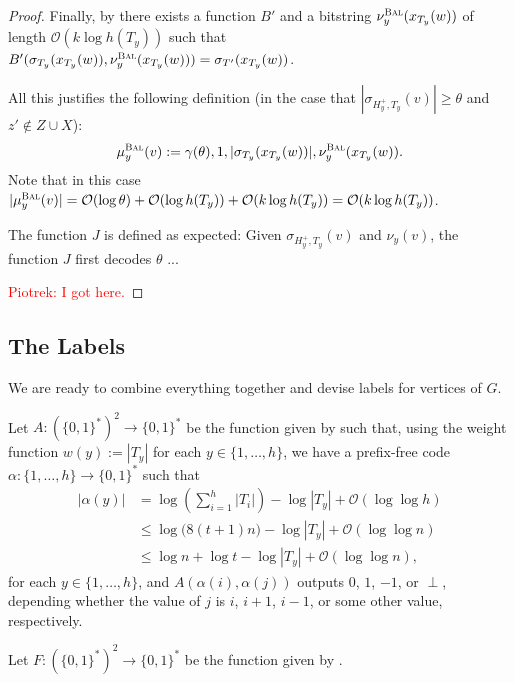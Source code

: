 \documentclass[kpfonts]{patmorin}
\newcommand{\Oh}{\mathcal{O}}
\let\leq\leqslant
\let\geq\geqslant
\begin{document}
\begin{proof}
  Finally, by  there exists a function $B'$ and a bitstring 
  $\nu^{\textsc{Bal}}_y(x_{T_y}(w))$ of length $\Oh(k\log h(T_y))$ such that 
  $B'(\sigma_{T_y}(x_{T_y}(w)), \nu^{\textsc{Bal}}_y(x_{T_y}(w))) = \sigma_{T'}(x_{T_y}(w))$. 

  All this justifies the following definition (in the case that $|\sigma_{H^+_{y},T_{y}}(v)| \geq \theta$ and $z'\not\in Z\cup X$):
  \[
   \mu_y^{\textsc{Bal}}(v) := \gamma(\theta),1,|\sigma_{T_y}(x_{T_y}(w))|,\nu^{\textsc{Bal}}_y(x_{T_y}(w)).
  \]
  Note that in this case $|\mu_y^{\textsc{Bal}}(v)|=\Oh(\log\theta)+\Oh(\log h(T_y)) + \Oh(k\log h(T_y)) = \Oh(k\log h(T_y))$.

  The function $J$ is defined as expected:
  Given $\sigma_{H^+_y,T_{y}}(v)$ and $\nu_y(v)$, the function $J$ first decodes $\theta$ ...

\textcolor{red}{Piotrek: I got here.}

\end{proof}

\subsection{The Labels}

We are ready to combine everything together and devise labels for vertices of $G$.

Let $A:(\{0,1\}^{*})^2\to\{0,1\}^*$ be the function given by  such that, 
using the weight function $w(y):=|T_y|$ for each $y\in\{1,\ldots,h\}$,
we have a prefix-free code $\alpha:\{1,\ldots,h\}\to\{0,1\}^*$ such that
\begin{align*}
|\alpha(y)|&=\log\left(\textstyle\sum_{i=1}^h|T_i|\right) - \log|T_y| + \Oh(\log\log h)\\
&\leq \log\bigl( 8(t+1)n\bigr) - \log|T_y| + \Oh(\log\log n)\\
&\leq \log n + \log t -\log|T_y| + \Oh(\log\log n),
\end{align*}
for each $y\in\{1,\ldots,h\}$, and $A(\alpha(i),\alpha(j))$ outputs $0$, $1$, $-1$, or $\perp$, depending whether the value of $j$ is $i$, $i+1$, $i-1$, or some other value, respectively.


Let $F:(\{0,1\}^{*})^2\to\{0,1\}^*$ be the function given by .
\end{document}

